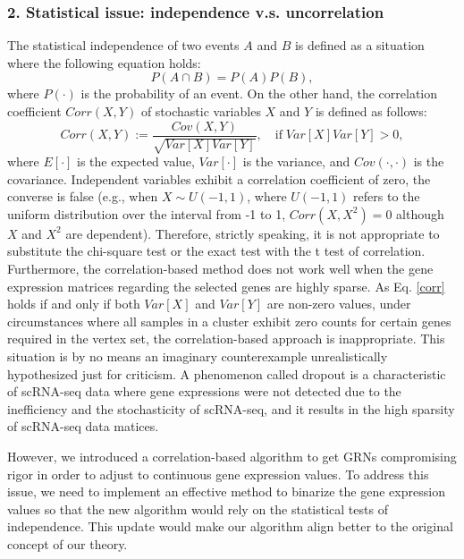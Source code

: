 \documentclass{article}
\begin{document}
\subsubsection*{2. Statistical issue: independence v.s. uncorrelation}
The statistical independence of two events $A$ and $B$ is defined as a situation where the following equation holds:
\begin{equation}\label{independence}
  P(A\cap B)=P(A)P(B),
\end{equation}
where $P(\cdot)$ is the probability of an event. On the other hand, the correlation coefficient $Corr(X, Y)$ of stochastic variables 
$X$ and $Y$ is defined as follows:
\begin{equation}\label{corr}
  Corr(X, Y):=\frac{Cov(X, Y)}{\sqrt{Var[X]Var[Y]}},\quad \text{if}\; Var[X]Var[Y] > 0,
\end{equation}
where $E[\cdot]$ is the expected value, $Var[\cdot]$ is the variance, and $Cov(\cdot, \cdot)$ is the covariance. Independent variables 
exhibit a correlation coefficient of zero, the converse is false (e.g., when $X\sim U(-1, 1)$, where $U(-1, 1)$ refers to the uniform 
distribution over the interval from -1 to 1, $Corr(X, X^2)=0$ although $X$ and $X^2$ are dependent). Therefore, strictly 
speaking, it is not appropriate to substitute the chi-square test or the exact test with the t test of correlation. 
Furthermore, the correlation-based method does not work well when the gene expression matrices regarding the 
selected genes are highly sparse. As Eq. \eqref{corr} holds if and only if both $Var[X]$ and $Var[Y]$ are non-zero values, under 
circumstances where all samples in a cluster exhibit zero counts for certain genes required in the vertex set, 
the correlation-based approach is inappropriate. This situation is by no means an imaginary counterexample 
unrealistically hypothesized just for criticism. A phenomenon called dropout is a characteristic of scRNA-seq data 
where gene expressions were not detected due to the inefficiency and the stochasticity of scRNA-seq\cite{qiu2020embracing}, and it 
results in the high sparsity of scRNA-seq data matices.

However, we introduced a correlation-based algorithm to get GRNs compromising rigor in order to adjust to 
continuous gene expression values. To address this issue, we need to implement an effective method to binarize the 
gene expression values so that the new algorithm would rely on the statistical tests of independence. This update 
would make our algorithm align better to the original concept of our theory.
\end{document}

